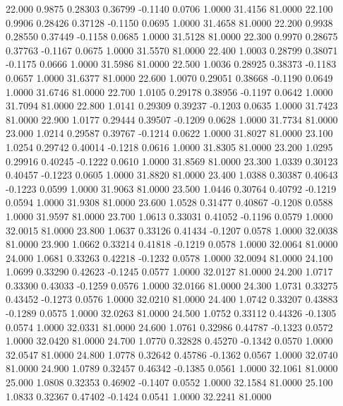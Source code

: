   22.000   0.9875   0.28303   0.36799  -0.1140   0.0706   1.0000  31.4156  81.0000
  22.100   0.9906   0.28426   0.37128  -0.1150   0.0695   1.0000  31.4658  81.0000
  22.200   0.9938   0.28550   0.37449  -0.1158   0.0685   1.0000  31.5128  81.0000
  22.300   0.9970   0.28675   0.37763  -0.1167   0.0675   1.0000  31.5570  81.0000
  22.400   1.0003   0.28799   0.38071  -0.1175   0.0666   1.0000  31.5986  81.0000
  22.500   1.0036   0.28925   0.38373  -0.1183   0.0657   1.0000  31.6377  81.0000
  22.600   1.0070   0.29051   0.38668  -0.1190   0.0649   1.0000  31.6746  81.0000
  22.700   1.0105   0.29178   0.38956  -0.1197   0.0642   1.0000  31.7094  81.0000
  22.800   1.0141   0.29309   0.39237  -0.1203   0.0635   1.0000  31.7423  81.0000
  22.900   1.0177   0.29444   0.39507  -0.1209   0.0628   1.0000  31.7734  81.0000
  23.000   1.0214   0.29587   0.39767  -0.1214   0.0622   1.0000  31.8027  81.0000
  23.100   1.0254   0.29742   0.40014  -0.1218   0.0616   1.0000  31.8305  81.0000
  23.200   1.0295   0.29916   0.40245  -0.1222   0.0610   1.0000  31.8569  81.0000
  23.300   1.0339   0.30123   0.40457  -0.1223   0.0605   1.0000  31.8820  81.0000
  23.400   1.0388   0.30387   0.40643  -0.1223   0.0599   1.0000  31.9063  81.0000
  23.500   1.0446   0.30764   0.40792  -0.1219   0.0594   1.0000  31.9308  81.0000
  23.600   1.0528   0.31477   0.40867  -0.1208   0.0588   1.0000  31.9597  81.0000
  23.700   1.0613   0.33031   0.41052  -0.1196   0.0579   1.0000  32.0015  81.0000
  23.800   1.0637   0.33126   0.41434  -0.1207   0.0578   1.0000  32.0038  81.0000
  23.900   1.0662   0.33214   0.41818  -0.1219   0.0578   1.0000  32.0064  81.0000
  24.000   1.0681   0.33263   0.42218  -0.1232   0.0578   1.0000  32.0094  81.0000
  24.100   1.0699   0.33290   0.42623  -0.1245   0.0577   1.0000  32.0127  81.0000
  24.200   1.0717   0.33300   0.43033  -0.1259   0.0576   1.0000  32.0166  81.0000
  24.300   1.0731   0.33275   0.43452  -0.1273   0.0576   1.0000  32.0210  81.0000
  24.400   1.0742   0.33207   0.43883  -0.1289   0.0575   1.0000  32.0263  81.0000
  24.500   1.0752   0.33112   0.44326  -0.1305   0.0574   1.0000  32.0331  81.0000
  24.600   1.0761   0.32986   0.44787  -0.1323   0.0572   1.0000  32.0420  81.0000
  24.700   1.0770   0.32828   0.45270  -0.1342   0.0570   1.0000  32.0547  81.0000
  24.800   1.0778   0.32642   0.45786  -0.1362   0.0567   1.0000  32.0740  81.0000
  24.900   1.0789   0.32457   0.46342  -0.1385   0.0561   1.0000  32.1061  81.0000
  25.000   1.0808   0.32353   0.46902  -0.1407   0.0552   1.0000  32.1584  81.0000
  25.100   1.0833   0.32367   0.47402  -0.1424   0.0541   1.0000  32.2241  81.0000
